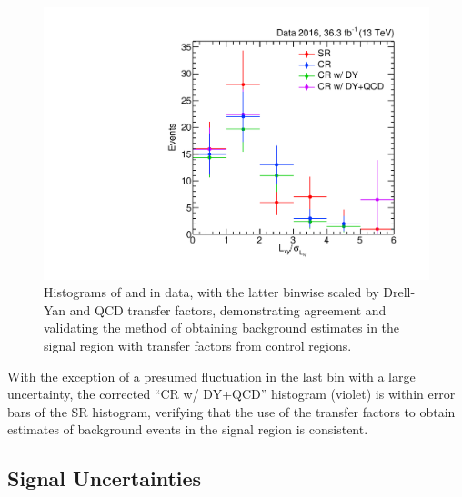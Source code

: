 \begin{figure}[htbp]
  \hspace*{-2em}
  \includegraphics[width=\DSquareWidth]{figures/displaced/BGEST_smallLxySig.pdf}
  \caption{Histograms of  and  in data, with the latter binwise scaled by Drell-Yan and QCD transfer factors, demonstrating agreement and validating the method of obtaining background estimates in the signal region with transfer factors from control regions.}
  \label{fig:dd:TFLess}
\end{figure}
\clearpage

With the exception of a presumed fluctuation in the last bin with a large uncertainty, the corrected ``CR w/ DY+QCD'' histogram (violet) is within error bars of the SR histogram, verifying that the use of the transfer factors to obtain estimates of background events in the signal region is consistent.

\subsection{Signal Uncertainties}
